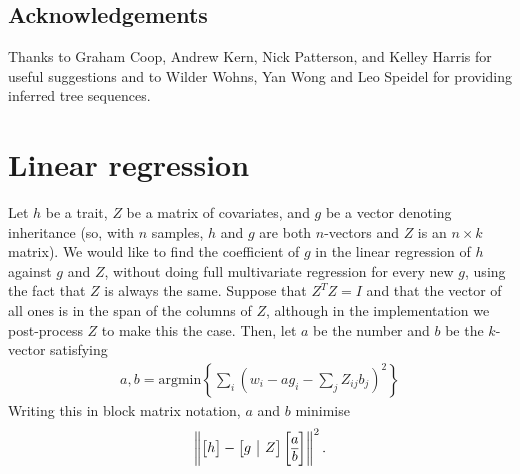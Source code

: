 \documentclass{article}
\begin{document}
\subsection*{Acknowledgements}
Thanks to Graham Coop, Andrew Kern, Nick Patterson, and Kelley Harris for useful suggestions
and to Wilder Wohns, Yan Wong and Leo Speidel for providing inferred tree sequences.




\clearpage
\appendix
\setcounter{table}{0}
\renewcommand{\thetable}{S\arabic{table}}
\setcounter{figure}{0}
\renewcommand{\thefigure}{S\arabic{figure}}




\appendix

\section{Linear regression}
\label{apx:regression}

Let $h$ be a trait, $Z$ be a matrix of covariates, and $g$ be a vector denoting inheritance
(so, with $n$ samples, $h$ and $g$ are both $n$-vectors and $Z$ is an $n \times k$ matrix).
We would like to find the coefficient of $g$ in the linear regression of $h$ against $g$ and $Z$,
without doing full multivariate regression for every new $g$,
using the fact that $Z$ is always the same.
Suppose that $Z^T Z = I$ and that the vector of all ones is in the span of the columns of $Z$,
although in the implementation we post-process $Z$ to make this the case.
Then, let $a$ be the number and $b$ be the $k$-vector satisfying
\begin{align*}
    a, b = \text{argmin}\left\{ \sum_i \left( w_i - a g_i - \sum_j Z_{ij} b_j \right)^2 \right\}
\end{align*}
Writing this in block matrix notation, $a$ and $b$ minimise
\begin{align*}
    \left\|
        \left[ \begin{array}{@{}c@{}} h \end{array}\right]
            -
        \left[ \begin{array}{@{}c|c@{}} g & Z \end{array} \right]
            \left[ \begin{array}{@{}c@{}} a \\ \hline b \end{array} \right]
    \right\|^2 .
\end{align*}
\end{document}
